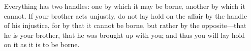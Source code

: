 Everything has two handles: one by which it may be borne, another by
which it cannot. If your brother acts unjustly, do not lay hold on the
affair by the handle of his injustice, for by that it cannot be borne,
but rather by the opposite---that he is your brother, that he was brought
up with you; and thus you will lay hold on it as it is to be borne.
